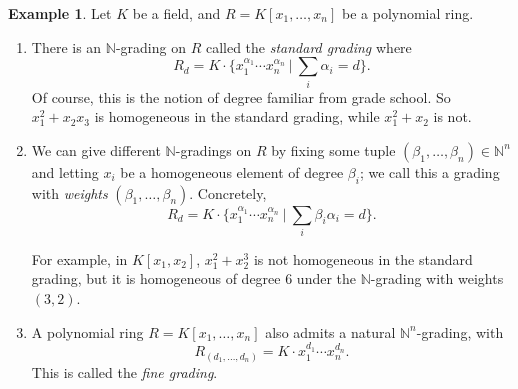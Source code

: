 \documentclass{amsart}[12pt]
\newcommand{\vx}{\underline{x}}
\newcommand{\NN}{\mathbb{N}}
\newcommand{\DEF}[1]{\emph{#1}\index{#1}}
\numberwithin{equation}{section}
\theoremstyle{plain} %
\theoremstyle{definition}
\newtheorem{example}[equation]{Example}
\theoremstyle{remark}
\begin{document}
\begin{example} Let $K$ be a field, and  $R=K[x_1,\dots,x_n]$ be a polynomial ring.
	\begin{enumerate}
	
		
		\item There is an $\NN$-grading on $R$ called the \DEF{standard grading} where 
		\[ R_d = K \cdot \{ x_1^{\alpha_1}\cdots x_n^{\alpha_n} \ | \ \sum_i \alpha_i =d\}.\]
		 Of course, this is the notion of degree familiar from grade school. So $x_1^2+x_2x_3$ is homogeneous in the standard grading, while $x_1^2+x_2$ is not.
		
		\item We can give different $\NN$-gradings on $R$ by fixing some tuple $(\beta_1,\dots,\beta_n)\in \NN^n$ and letting $x_i$ be a homogeneous element of degree $\beta_i$; we call this a grading with \emph{weights} $(\beta_1,\dots,\beta_n)$. Concretely,
		\[ R_d = K \cdot \{ x_1^{\alpha_1}\cdots x_n^{\alpha_n} \ | \ \sum_i \beta_i \alpha_i =d\}.\]

		
		For example, in $K[x_1,x_2]$, $x_1^2+x_2^3$ is not homogeneous in the standard grading, but it is homogeneous of degree $6$ under the $\mathbb{N}$-grading with weights $(3,2)$.
	
		\item A polynomial ring $R = K[x_1, \ldots, x_n]$ also admits a natural $\NN^n$-grading, with 
		\[ R_{(d_1,\dots,d_n)}= {K \cdot x_1^{d_1}\cdots x_n^{d_n}}.\]
		 This is called the \emph{fine grading}.
			
				\end{enumerate}	
\end{example}
\end{document}
